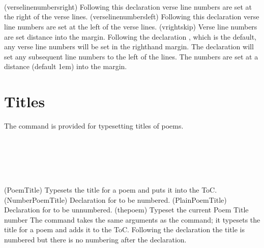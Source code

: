 \begin{syntax}
\cmd{\verselinenumbersright} \\
\cmd{\verselinenumbersleft} \\
\lnc{\vrightskip} \\
\end{syntax}
\glossary(verselinenumbersright)%
  {}%
  {Following this declaration verse line numbers are set at the right of the
   verse lines.}
\glossary(verselinenumbersleft)%
  {}%
  {Following this declaration verse line numbers are set at the left of the
   verse lines.}
\glossary(vrightskip)
  {}%
  {Verse line numbers are set distance  into the margin.}
Following the declaration
\cmd{\verselinenumbersright}, which is the default, any verse line numbers
will be set in the righthand margin. 
The \cmd{\verselinenumbersleft}
declaration will set any subsequent line numbers to the left of the lines.
The numbers are set at a distance
\lnc{\vrightskip} (default 1em) into the margin. 


\section{Titles}

    The \cmd{\PoemTitle} command is provided for typesetting titles
of poems.

\begin{syntax}
\cmd{\PoemTitle} \\
\cmd{\NumberPoemTitle} \\
\cmd{\PlainPoemTitle} \\
\cmd{\thepoem} \\
\end{syntax}
\glossary(PoemTitle)%
  {}%
  {Typesets the title for a poem and puts it into the ToC.}
\glossary(NumberPoemTitle)%
  {}%
  {Declaration for  to be numbered.}
\glossary(PlainPoemTitle)%
  {}%
  {Declaration for  to be unnumbered.}
\glossary(thepoem)%
  {}%
  {Typeset the current Poem Title number}%
The \cmd{\PoemTitle} command takes the same arguments as the 
\cmd{\chapter} command; it typesets the title for a poem 
and adds it to the ToC. 
Following the declaration \cmd{\NumberPoemTitle}
the title is numbered but there is no numbering after the
\cmd{\PlainPoemTitle} declaration. 

